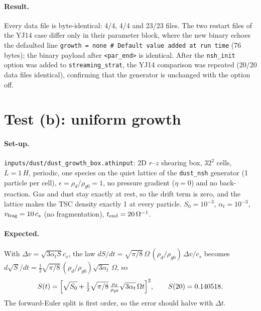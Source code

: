 \documentclass[11pt]{article}
\newcommand{\code}[1]{\texttt{#1}}
\newcommand{\file}[1]{\texttt{\small #1}}
\newcommand{\St}{S}
\newcommand{\vf}{v_{\rm frag}}
\begin{document}
\paragraph{Result.} Every data file is byte-identical: 4/4, 4/4 and 23/23 files. The two
restart files of the YJ14 case differ only in their parameter block, where the new
binary echoes the defaulted line \code{growth = none \# Default value added at run time}
(76 bytes); the binary payload after \code{<par\_end>} is identical. After the
\code{nsh\_init} option was added to \code{streaming\_strat}, the YJ14 comparison was
repeated (20/20 data files identical), confirming that the generator is unchanged with
the option off.

\section{Test (b): uniform growth}

\paragraph{Set-up.} \file{inputs/dust/dust\_growth\_box.athinput}: 2D $r$--$z$ shearing
box, $32^2$ cells, $L=1\,H$, periodic, one species on the quiet lattice of the
\code{dust\_nsh} generator (1 particle per cell), $\epsilon=\rho_d/\rho_{g0}=1$, no
pressure gradient ($\eta=0$) and no back-reaction. Gas and dust stay exactly at rest,
so the drift term is zero, and the lattice makes the TSC density exactly 1 at every
particle. $\St_0=10^{-3}$, $\alpha_t=10^{-3}$, $\vf=10\,c_s$ (no fragmentation),
$t_{\rm end}=20\,\Omega^{-1}$.

\paragraph{Expected.} With $\Delta v=\sqrt{3\alpha_t\St}c_s$, the law
$d\St/dt=\sqrt{\pi/8}\,\Omega\,(\rho_d/\rho_{g0})\,\Delta v/c_s$ becomes
$d\sqrt{\St}/dt=\tfrac12\sqrt{\pi/8}\,(\rho_d/\rho_{g0})\sqrt{3\alpha_t}\,\Omega$, so
\begin{equation}
  \St(t)=\Bigl[\sqrt{\St_0}+\tfrac12\sqrt{\pi/8}\,\tfrac{\rho_d}{\rho_{g0}}
         \sqrt{3\alpha_t}\,\Omega t\Bigr]^2 ,
  \qquad \St(20)=0.140518 .
\end{equation}
The forward-Euler split is first order, so the error should halve with $\Delta t$.
\end{document}
